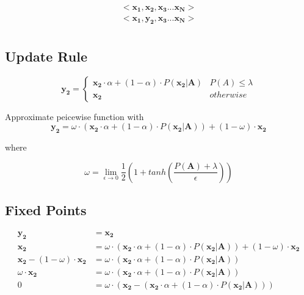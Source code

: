 

\begin{align*}
    <\mathbf{x_1, x_2, x_3 ... x_N}> \\
    <\mathbf{x_1, y_2, x_3 ... x_N}> \\
\end{align*}

\subsection*{Update Rule}


\[ \mathbf{y_2} =  \begin{cases} 
      \mathbf{x_2} \cdot \alpha + (1 - \alpha) \cdot P( \mathbf{x_2} | \mathbf{A}) & P(A) \leq \lambda \\
      \mathbf{x_2} & otherwise 
   \end{cases}
\]

Approximate peicewise function with 
\begin{equation*}
    \mathbf{y_2} = \omega \cdot (\mathbf{x_2} \cdot \alpha + (1 - \alpha) \cdot P( \mathbf{x_2} | \mathbf{A})) + (1 - \omega) \cdot \mathbf{x_2}
\end{equation*}

where 

\begin{equation*}
    \omega =  \lim_{\epsilon \to 0}  \frac{1}{2} \left( 1 + tanh \left( \frac{P(\mathbf{A}) + \lambda}{\epsilon}  \right) \right)
\end{equation*}

\subsection*{Fixed Points}

\begin{align*}
    \mathbf{y_2} &= \mathbf{x_2}\\
    \mathbf{x_2} &= \omega \cdot (\mathbf{x_2} \cdot \alpha + (1 - \alpha) \cdot P( \mathbf{x_2} | \mathbf{A})) + (1 - \omega) \cdot \mathbf{x_2}\\
    \mathbf{x_2} - (1 - \omega) \cdot \mathbf{x_2} &= \omega \cdot (\mathbf{x_2} \cdot \alpha + (1 - \alpha) \cdot P( \mathbf{x_2} | \mathbf{A}))\\
    \omega \cdot \mathbf{x_2} &= \omega \cdot (\mathbf{x_2} \cdot \alpha + (1 - \alpha) \cdot P( \mathbf{x_2} | \mathbf{A}))\\
    0 &= \omega \cdot (\mathbf{x_2} - (\mathbf{x_2} \cdot \alpha + (1 - \alpha) \cdot P( \mathbf{x_2} | \mathbf{A}))) \\
\end{align*}

